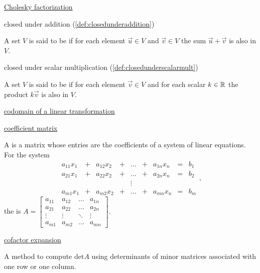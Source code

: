 \documentclass{ximera}
\begin{document}
\href{https://ximera.osu.edu/linearalgebradzv3/LinearAlgebraInteractiveIntro/RTH-0045/main}{Cholesky factorization}

closed under addition (\ref{def:closedunderaddition})
\begin{expandable}{}{}
    A set $V$ is said to be  if for each element $\vec{u} \in V$ and $\vec{v} \in V$ the sum $\vec{u}+\vec{v}$ is also in $V$.
\end{expandable}

closed under scalar multiplication (\ref{def:closedunderscalarmult})
\begin{expandable}{}{}
    A set $V$ is said to be  if for each element $\vec{v} \in V$  and for each scalar $k \in \mathbb{R}$ the product $k\vec{v}$ is also in $V$.
\end{expandable}

\href{https://ximera.osu.edu/linearalgebradzv3/LinearAlgebraInteractiveIntro/LTR-0010/main}{codomain of a linear transformation}

\href{https://ximera.osu.edu/linearalgebradzv3/LinearAlgebraInteractiveIntro/SYS-0020/main}{coefficient matrix}
\begin{expandable}{}{}
    A  is a matrix whose entries are the coefficients of a system of linear equations.  For the system $$\begin{array}{ccccccccc}
      a_{11}x_1 &+ &a_{12}x_2&+&\ldots&+&a_{1n}x_n&= &b_1 \\
	 a_{21}x_1 &+ &a_{22}x_2&+&\ldots&+&a_{2n}x_n&= &b_2 \\
     &&&&\vdots&&&& \\
     a_{m1}x_1 &+ &a_{m2}x_2&+&\ldots&+&a_{mn}x_n&= &b_m
    \end{array},$$ 
    the  is $A=\begin{bmatrix}a_{11}&a_{12}&\ldots&a_{1n}\\a_{21}&a_{22}&\ldots&a_{2n}\\\vdots&\vdots&\ddots&\vdots\\a_{m1}&a_{m2}&\ldots&a_{mn}\end{bmatrix}$.
\end{expandable}

\href{https://ximera.osu.edu/linearalgebradzv3/LinearAlgebraInteractiveIntro/DET-0010/main}{cofactor expansion}
\begin{expandable}{}{}
    A method to compute $\mbox{det} A$ using determinants of minor matrices associated with one row or one column.
\end{expandable}
\end{document}
